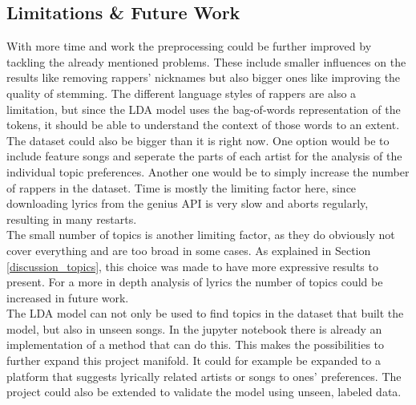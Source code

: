 \documentclass[conference]{IEEEtran}
\begin{document}
\subsection{Limitations \& Future Work}
With more time and work the preprocessing could be further improved by tackling the already mentioned problems. These include smaller influences on the results like removing rappers' nicknames but also bigger ones like improving the quality of stemming. The different language styles of rappers are also a limitation, but since the LDA model uses the bag-of-words representation of the tokens, it should be able to understand the context of those words to an extent. The dataset could also be bigger than it is right now. One option would be to include feature songs and seperate the parts of each artist for the analysis of the individual topic preferences. Another one would be to simply increase the number of rappers in the dataset. Time is mostly the limiting factor here, since downloading lyrics from the genius API is very slow and aborts regularly, resulting in many restarts.\\
The small number of topics is another limiting factor, as they do obviously not cover everything and are too broad in some cases. As explained in Section \ref{discussion_topics}, this choice was made to have more expressive results to present. For a more in depth analysis of lyrics the number of topics could be increased in future work.\\
The LDA model can not only be used to find topics in the dataset that built the model, but also in unseen songs. In the jupyter notebook there is already an implementation of a method that can do this. This makes the possibilities to further expand this project manifold. It could for example be expanded to a platform that suggests lyrically related artists or songs to ones' preferences. The project could also be extended to validate the model using unseen, labeled data.
\end{document}
